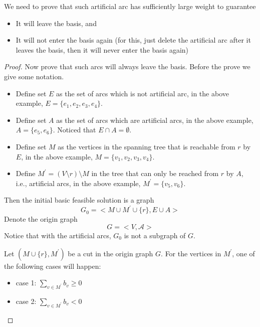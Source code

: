 					We need to prove that such artificial arc has sufficiently large weight to guarantee
					\begin{itemize}
						\item It will leave the basis, and
						\item It will not enter the basis again (for this, just delete the artificial arc after it leaves the basis, then it will never enter the basis again)
					\end{itemize}
					\begin{proof}
						Now prove that such arcs will always leave the basis. Before the prove we give some notation. 
						\begin{itemize}
							\item Define set $E$ as the set of arcs which is not artificial arc, in the above example, $E = \{e_1, e_2, e_3, e_4\}$. 
							\item Define set $A$ as the set of arcs which are artificial arcs, in the above example, $A = \{e_5, e_6\}$. Noticed that $E \cap A = \emptyset$.
							\item Define set $M$ as the vertices in the spanning tree that is reachable from $r$ by $E$, in the above example, $M = \{v_1, v_2, v_3, v_4\}$.
							\item Define $M^\prime = (V\setminus r) \setminus M$ in the tree that can only be reached from $r$ by $A$, i.e., artificial arcs, in the above example, $M^\prime = \{v_5, v_6\}$. 
						\end{itemize}

						Then the initial basic feasible solution is a graph 
						\begin{equation}
							G_0 = <M\cup M^\prime \cup \{r\}, E\cup A>
						\end{equation}
						Denote the origin graph 
						\begin{equation}
							G = <V, \mathcal{A}>
						\end{equation}
						Notice that with the artificial arcs, $G_0$ is not a subgraph of $G$.

						Let $(M\cup\{r\}, M^\prime)$ be a cut in the origin graph $G$. For the vertices in $M^\prime$, one of the following cases will happen:
						\begin{itemize}
							\item case 1: $\sum_{v \in M^\prime} b_v \ge 0$
							\item case 2: $\sum_{v \in M^\prime} b_v < 0$
						\end{itemize}


\end{proof}
